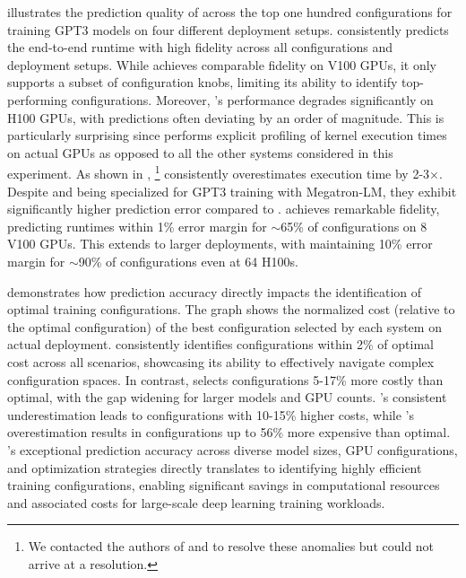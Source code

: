   illustrates the prediction quality of \sysname across the top one hundred configurations for training GPT3 models on four different deployment setups. \sysname consistently predicts the end-to-end runtime with high fidelity across all configurations and deployment setups. While \prot achieves comparable fidelity on V100 GPUs, it only supports a subset of configuration knobs, limiting its ability to identify top-performing configurations. Moreover, \prot's performance degrades significantly on H100 GPUs, with predictions often deviating by an order of magnitude. This is particularly surprising since \prot performs explicit profiling of kernel execution times on actual GPUs as opposed to all the other systems considered in this experiment. As shown in , \amped \footnote{We contacted the authors of \prot and \amped to resolve these anomalies but could not arrive at a resolution.} consistently overestimates execution time by 2-3$\times$. Despite \calc and \amped being specialized for GPT3 training with Megatron-LM, they exhibit significantly higher prediction error compared to \sysname. \sysname achieves remarkable fidelity, predicting runtimes within 1\% error margin for $\sim$65\% of configurations on 8 V100 GPUs. This extends to larger deployments, with \sysname maintaining 10\% error margin for $\sim$90\% of configurations even at 64 H100s.




  demonstrates how prediction accuracy directly impacts the identification of optimal training configurations. The graph shows the normalized cost (relative to the optimal configuration) of the best configuration selected by each system on actual deployment. \sysname consistently identifies configurations within 2\% of optimal cost across all scenarios, showcasing its ability to effectively navigate complex configuration spaces. In contrast, \prot selects configurations 5-17\% more costly than optimal, with the gap widening for larger models and GPU counts. \calc's consistent underestimation leads to configurations with 10-15\% higher costs, while \amped's overestimation results in configurations up to 56\% more expensive than optimal.
\sysname's exceptional prediction accuracy across diverse model sizes, GPU configurations, and optimization strategies directly translates to identifying highly efficient training configurations, enabling significant savings in computational resources and associated costs for large-scale deep learning training workloads.

